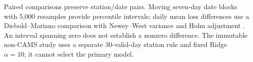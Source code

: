 Paired comparisons preserve station/date pairs. Moving seven-day date blocks
with 5,000 resamples provide percentile intervals; daily mean loss differences
use a Diebold--Mariano comparison with Newey--West variance and Holm adjustment
\cite{diebold1995comparing}. An interval spanning zero does not establish a
nonzero difference. The immutable non-CAMS study uses a separate 30-valid-day
station rule and fixed Ridge $\alpha=10$; it cannot select the primary model.
